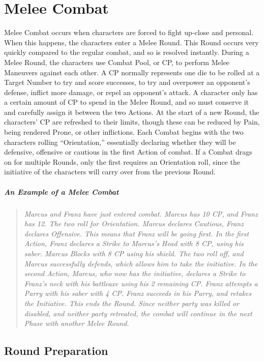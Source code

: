 \documentclass[oneside,11pt,english]{book}
\begin{document}
\section{Melee Combat}
Melee Combat occurs when characters are forced to fight up-close and personal. When this happens, the
characters enter a Melee Round. This Round occurs very quickly compared to the regular combat, and so
is resolved instantly.
During a Melee Round, the characters use Combat Pool, or CP, to perform Melee Maneuvers against each
other. A CP normally represents one die to be rolled at a Target Number to try and score successes, to try
and overpower an opponent’s defense, inflict more damage, or repel an opponent’s attack. A character
only has a certain amount of CP to spend in the Melee Round, and so must conserve it and carefully
assign it between the two Actions. At the start of a new Round, the characters’ CP are refreshed to their
limits, though these can be reduced by Pain, being rendered Prone, or other inflictions.
Each Combat begins with the two characters rolling “Orientation,” essentially declaring whether they will
be defensive, offensive or cautious in the first Action of combat. If a Combat drags on for multiple
Rounds, only the first requires an Orientation roll, since the initiative of the characters will carry over
from the previous Round.
\subparagraph{An Example of a Melee Combat}
\begin{quotation}
	\emph{Marcus and Franz have just entered combat. Marcus has 10 CP, and Franz has 12.
	The two roll for Orientation. Marcus declares Cautious, Franz declares Offensive. This means that Franz
	will be going first.
	In the first Action, Franz declares a Strike to Marcus’s Head with 8 CP, using his saber. Marcus Blocks
	with 8 CP using his shield. The two roll off, and Marcus successfully defends, which allows him to take
	the initiative.
	In the second Action, Marcus, who now has the initiative, declares a Strike to Franz’s neck with his
	battleaxe using his 2 remaining CP. Franz attempts a Parry with his saber with 4 CP. Franz succeeds in
	his Parry, and retakes the Initiative. This ends the Round. Since neither party was killed or disabled, and
	neither party retreated, the combat will continue in the next Phase with another Melee Round.}
\end{quotation}

\subsection{Round Preparation}
\end{document}
